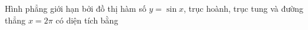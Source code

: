 \begin{ex}
Hình phẳng giới hạn bởi đồ thị hàm số $y=\sin x$, trục hoành, trục tung và đường thẳng $x=2\pi$ có diện tích bằng
\end{ex}
